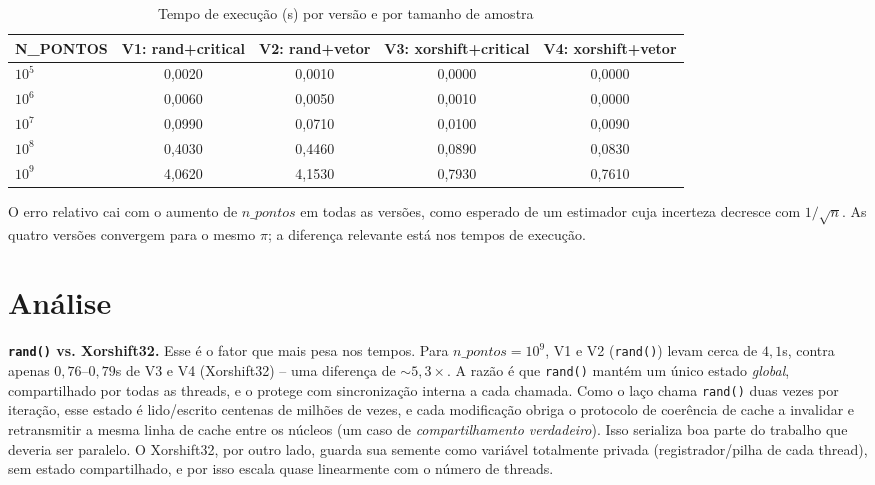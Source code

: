 \documentclass[a4paper,12pt]{article}
\begin{document}
\begin{table}[h]
    \centering
    \caption{Tempo de execução (s) por versão e por tamanho de amostra}
    \label{tab:tempos}
    \begin{adjustbox}{width=\textwidth}
        \begin{tabular}{@{}lcccc@{}}
            \toprule
            \textbf{N\_PONTOS} & \textbf{V1: rand+critical} & \textbf{V2: rand+vetor} & \textbf{V3: xorshift+critical} & \textbf{V4: xorshift+vetor} \\
            \midrule
            $10^5$  & 0,0020 & 0,0010 & 0,0000 & 0,0000 \\
            $10^6$  & 0,0060 & 0,0050 & 0,0010 & 0,0000 \\
            $10^7$  & 0,0990 & 0,0710 & 0,0100 & 0,0090 \\
            $10^8$  & 0,4030 & 0,4460 & 0,0890 & 0,0830 \\
            $10^9$  & 4,0620 & 4,1530 & 0,7930 & 0,7610 \\
            \bottomrule
        \end{tabular}
    \end{adjustbox}
\end{table}

O erro relativo cai com o aumento de $n\_pontos$ em todas as versões, como esperado de um estimador cuja
incerteza decresce com $1/\sqrt{n}$. As quatro versões convergem para o mesmo $\pi$; a diferença relevante
está nos tempos de execução.

\section{Análise}

\textbf{\texttt{rand()} vs. Xorshift32.} Esse é o fator que mais pesa nos tempos. Para $n\_pontos=10^9$,
V1 e V2 (\texttt{rand()}) levam cerca de $4,1$s, contra apenas $0,76$--$0,79$s de V3 e V4 (Xorshift32) --
uma diferença de $\sim 5,3\times$. A razão é que \texttt{rand()} mantém um único estado \emph{global},
compartilhado por todas as threads, e o protege com sincronização interna a cada chamada. Como o laço
chama \texttt{rand()} duas vezes por iteração, esse estado é lido/escrito centenas de milhões de vezes,
e cada modificação obriga o protocolo de coerência de cache a invalidar e retransmitir a mesma linha de
cache entre os núcleos (um caso de \emph{compartilhamento verdadeiro}). Isso serializa boa parte do
trabalho que deveria ser paralelo. O Xorshift32, por outro lado, guarda sua semente como variável
totalmente privada (registrador/pilha de cada thread), sem estado compartilhado, e por isso escala quase
linearmente com o número de threads.
\end{document}
